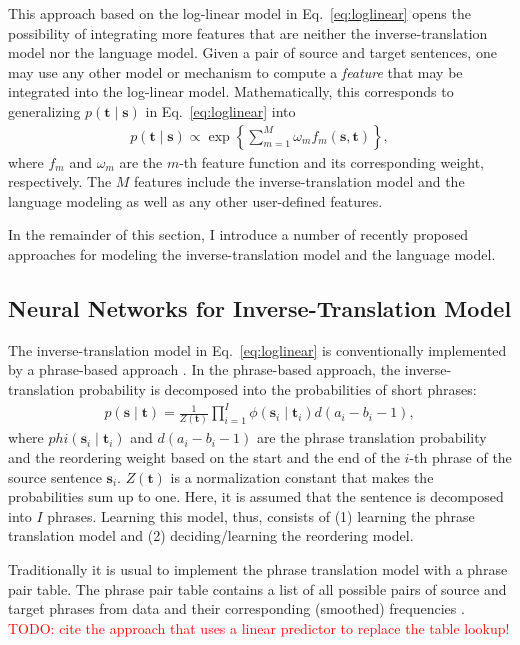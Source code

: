 \documentclass[11pt, oneside]{essay}
\newcommand{\vect}[1]{\mathbf{#1}}
\newcommand{\vs}[0]{\vect{s}}
\newcommand{\vt}[0]{\vect{t}}
\newcommand{\tred}[1]{\textcolor{red}{#1}}
\begin{document}
This approach based on the log-linear model in
Eq.~\eqref{eq:loglinear} opens the possibility of integrating
more features that are neither the inverse-translation model nor
the language model. Given a pair of source and target sentences,
one may use any other model or mechanism to compute a
\textit{feature} that may be integrated into the log-linear
model. Mathematically, this corresponds to generalizing $p(\vt
\mid \vs)$ in Eq.~\eqref{eq:loglinear} into
\begin{align}
\label{eq:loglinear_general}
    p(\vt \mid \vs) \propto \exp\left\{  
    \sum_{m=1}^M \omega_m f_m(\vs, \vt)
    \right\}, 
\end{align}
where $f_m$ and $\omega_m$ are the $m$-th feature function and
its corresponding weight, respectively. The $M$ features include
the inverse-translation model and the language modeling as well
as any other user-defined features.

In the remainder of this section, I introduce a number of
recently proposed approaches for modeling the
inverse-translation model and the language model.

\subsection{Neural Networks for Inverse-Translation Model}
\label{sec:nntm}

The inverse-translation model in Eq.~\eqref{eq:loglinear} is conventionally
implemented by a phrase-based approach \citep[see,
e.g.,][]{Koehn2003,Marcu2002}.  In the phrase-based approach, the
inverse-translation probability is decomposed into the
probabilities of short phrases:
\begin{align}
\label{eq:phrase_decomp}
    p(\vs \mid \vt) = \frac{1}{Z(\vt)} \prod_{i=1}^{I} \phi(\vs_i \mid \vt_i) d(a_i -
    b_i -1),
\end{align}
where $phi(\vs_i \mid \vt_i)$ and $d(a_i - b_i - 1)$ are the
phrase translation probability and the reordering weight based on
the start and the end of the $i$-th phrase of the source sentence
$\vs_i$. $Z(\vt)$ is a normalization constant that makes the
probabilities sum up to one. Here, it is assumed that the
sentence is decomposed into $I$ phrases. Learning this model,
thus, consists of (1) learning the phrase translation model and
(2) deciding/learning the reordering model.  

Traditionally it is usual to implement the phrase translation
model with a phrase pair table. The phrase pair table contains a
list of all possible pairs of source and target phrases from data
and their corresponding (smoothed) frequencies \citep[see,
e.g.,][]{Koehn2003,Koehn2010}. \tred{TODO: cite the approach that
    uses a linear predictor to replace the table lookup! \citep{Carpuat2007}}
\end{document}
